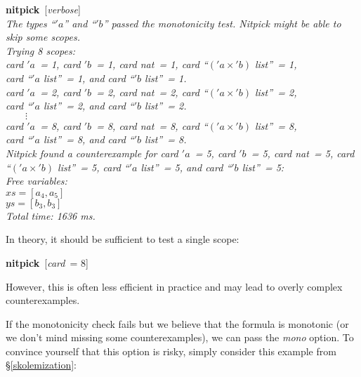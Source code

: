 \documentclass[a4paper,12pt]{article}
\begin{document}
\prew
\textbf{nitpick}~[\textit{verbose}] \\[2\smallskipamount]
\slshape
The types ``\kern1pt$'a$'' and ``\kern1pt$'b$'' passed the monotonicity test.
Nitpick might be able to skip some scopes.
 \\[2\smallskipamount]
Trying 8 scopes: \\
\hbox{}\qquad \textit{card} $'a$~= 1, \textit{card} $'b$~= 1,
\textit{card} \textit{nat}~= 1, \textit{card} ``$('a \times {'}b)$
\textit{list}''~= 1, \\
\hbox{}\qquad\quad \textit{card} ``\kern1pt$'a$ \textit{list}''~= 1, and
\textit{card} ``\kern1pt$'b$ \textit{list}''~= 1. \\
\hbox{}\qquad \textit{card} $'a$~= 2, \textit{card} $'b$~= 2,
\textit{card} \textit{nat}~= 2, \textit{card} ``$('a \times {'}b)$
\textit{list}''~= 2, \\
\hbox{}\qquad\quad \textit{card} ``\kern1pt$'a$ \textit{list}''~= 2, and
\textit{card} ``\kern1pt$'b$ \textit{list}''~= 2. \\
\hbox{}\qquad $\qquad\vdots$ \\[.5\smallskipamount]
\hbox{}\qquad \textit{card} $'a$~= 8, \textit{card} $'b$~= 8,
\textit{card} \textit{nat}~= 8, \textit{card} ``$('a \times {'}b)$
\textit{list}''~= 8, \\
\hbox{}\qquad\quad \textit{card} ``\kern1pt$'a$ \textit{list}''~= 8, and
\textit{card} ``\kern1pt$'b$ \textit{list}''~= 8.
\\[2\smallskipamount]
Nitpick found a counterexample for
\textit{card} $'a$~= 5, \textit{card} $'b$~= 5,
\textit{card} \textit{nat}~= 5, \textit{card} ``$('a \times {'}b)$
\textit{list}''~= 5, \textit{card} ``\kern1pt$'a$ \textit{list}''~= 5, and
\textit{card} ``\kern1pt$'b$ \textit{list}''~= 5:
\\[2\smallskipamount]
\hbox{}\qquad Free variables: \nopagebreak \\
\hbox{}\qquad\qquad $\textit{xs} = [a_4, a_5]$ \\
\hbox{}\qquad\qquad $\textit{ys} = [b_3, b_3]$ \\[2\smallskipamount]
Total time: 1636 ms.
\postw

In theory, it should be sufficient to test a single scope:

\prew
\textbf{nitpick}~[\textit{card}~= 8]
\postw

However, this is often less efficient in practice and may lead to overly complex
counterexamples.

If the monotonicity check fails but we believe that the formula is monotonic (or
we don't mind missing some counterexamples), we can pass the
\textit{mono} option. To convince yourself that this option is risky,
simply consider this example from \S\ref{skolemization}:
\end{document}

